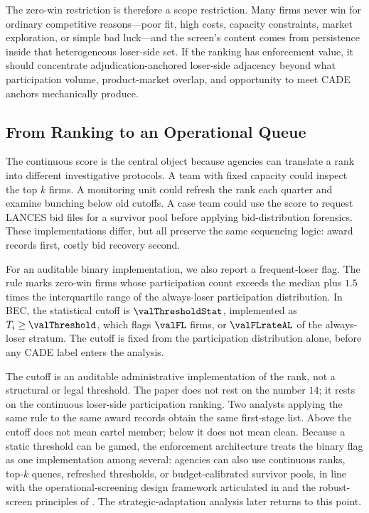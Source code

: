 The zero-win restriction is therefore a scope restriction. Many
firms never win for ordinary competitive reasons---poor fit, high
costs, capacity constraints, market exploration, or simple bad
luck---and the screen's content comes from persistence inside that
heterogeneous loser-side set. If the ranking has enforcement
value, it should concentrate adjudication-anchored loser-side
adjacency beyond what participation volume, product-market
overlap, and opportunity to meet CADE anchors mechanically
produce.

\subsection{From Ranking to an Operational Queue}
\label{sec:award_rule}

The continuous score is the central object because agencies can
translate a rank into different investigative protocols. A team
with fixed capacity could inspect the top $k$ firms. A
monitoring unit could refresh the rank each quarter and examine
bunching below old cutoffs. A case team could use the score to
request LANCES bid files for a survivor pool before applying
bid-distribution forensics. These implementations differ, but
all preserve the same sequencing logic: award records first,
costly bid recovery second.

For an auditable binary implementation, we also report a
frequent-loser flag. The rule marks zero-win firms whose
participation count exceeds the median plus $1.5$ times the
interquartile range of the always-loser participation
distribution. In BEC, the statistical cutoff is
$\valThresholdStat$, implemented as $T_i\geq\valThreshold$, which
flags $\valFL$ firms, or $\valFLrateAL$ of the always-loser
stratum. The cutoff is fixed from the participation distribution
alone, before any CADE label enters the analysis.

The cutoff is an auditable administrative implementation of the
rank, not a structural or legal threshold. The paper does not
rest on the number $14$; it rests on the continuous loser-side
participation ranking. Two analysts applying the same rule to
the same award records obtain the same first-stage list. Above
the cutoff does not mean cartel member; below it does not mean
clean. Because a static threshold can be gamed, the enforcement
architecture treats the binary flag as one implementation among
several: agencies can also use continuous ranks, top-$k$ queues,
refreshed thresholds, or budget-calibrated survivor pools, in
line with the operational-screening design framework articulated
in \citet{sanchezgraells2019screening} and the robust-screen
principles of \citet{chassang2022robust}. The
strategic-adaptation analysis later returns to this point.


